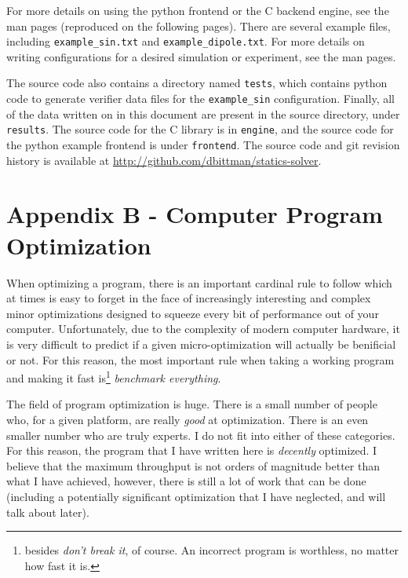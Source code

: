 \documentclass[12pt]{article}
\begin{document}
For more details on using the python frontend or the C backend engine, see the man pages (reproduced on the
following pages). There are several example files, including \texttt{example\_sin.txt} and \texttt{example\_dipole.txt}.
For more details on writing configurations for a desired simulation or experiment, see the man pages.

The source code also contains a directory named \texttt{tests}, which contains python code to generate verifier data
files for the \texttt{example\_sin} configuration. Finally, all of the data written on in this document are present
in the source directory, under \texttt{results}. The source code for the C library is in \texttt{engine}, and the
source code for the python example frontend is under \texttt{frontend}. The source code and git revision history
is available at \url{http://github.com/dbittman/statics-solver}.



\clearpage

\section{Appendix B - Computer Program Optimization}

When optimizing a program, there is an important cardinal rule to follow which at times
is easy to forget in the face of increasingly interesting and complex minor optimizations
designed to squeeze every bit of performance out of your computer. Unfortunately, due
to the complexity of modern computer hardware, it is
very difficult to predict if a given micro-optimization will actually be benificial or
not. For this reason, the most important rule when taking a working program and making it
fast is\footnote{besides \textit{don't break it}, of course. An incorrect program is worthless, no matter
how fast it is.} \textit{benchmark everything}.

The field of program optimization is huge. There is a small number of people who, for
a given platform, are really \textit{good} at optimization. There is an even smaller number
who are truly experts. I do not fit into either of these categories. For this reason, the program
that I have written here is \textit{decently} optimized. I believe that the maximum throughput
is not orders of magnitude better than what I have achieved, however, there is still a lot of work
that can be done (including a potentially significant optimization that I have neglected, and will talk
about later).

\end{document}
